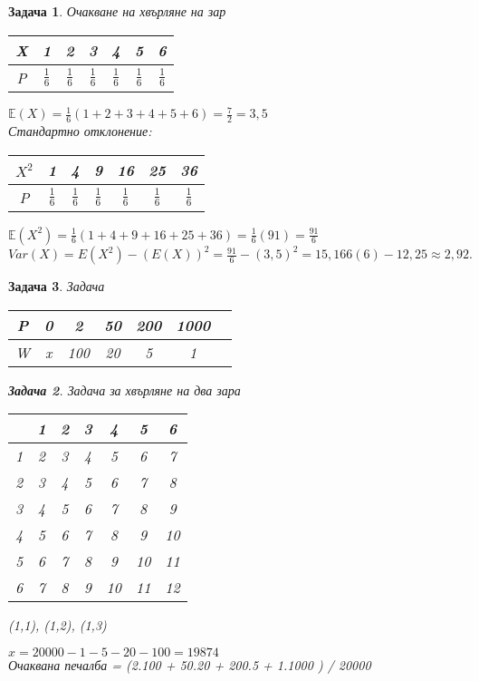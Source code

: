 \documentclass{article}
\newtheorem{problem}{Задача}
\begin{document}
		\begin{problem}
			Очакване на хвърляне на зар
			\begin{tabular}{|c|c c c c c c|} 
				\hline
				X & 1 & 2 & 3 & 4 & 5 & 6 \\ 
				\hline
				P & $\frac{1}{6}$ & $\frac{1}{6}$ & $\frac{1}{6}$ & $\frac{1}{6}$ & $\frac{1}{6}$ & $\frac{1}{6}$  \\ 
				\hline
			\end{tabular}
		\newline
		$\mathbb E(X) = \frac{1}{6}(1+2+3+4+5+6) = \frac{7}{2} = 3,5 $ \\
		Стандартно отклонение:
		\begin{tabular}{|c|c c c c c c|} 
			\hline
			$X^2$ & 1 & 4 & 9 & 16 & 25 & 36 \\ 
			\hline
			P & $\frac{1}{6}$ & $\frac{1}{6}$ & $\frac{1}{6}$ & $\frac{1}{6}$ & $\frac{1}{6}$ & $\frac{1}{6}$  \\ 
			\hline
		\end{tabular}
	\newline
		$\mathbb E(X^2) = \frac{1}{6}(1+4+9+16+25+36)  = \frac{1}{6}(91) = \frac{91}{6} $ \\
		$ Var(X) = E(X^2) - (E(X))^2 = \frac{91}{6} - (3,5)^2 = 15,166(6) - 12,25 \approx 2,92.$
	\end{problem}
	
	
	\begin{problem}
	Задача
		\begin{tabular}{|c|c c c c c c||} 
		\hline
		P&	0& 2&  50&  200&  1000&  \\
		\hline
		W&	x& 100&  20&  5&  1&  \\
		\hline
	\end{tabular}

\begin{problem}
	Задача за хвърляне на два зара
	\begin{tabular}{|c|c c c c c c|}
	  & 1 & 2 & 3 & 4 & 5 & 6 \\
		\hline
	 1  & 2 & 3 & 4 & 5 & 6 & 7 \\
	2 &	 3 & 4 & 5 & 6 & 7 & 8 \\
	3 &	4 & 5 & 6 & 7 & 8 & 9 \\
4 &		 5 & 6 & 7 & 8 & 9 & 10 \\
5 &	6 & 7 & 8 & 9 & 10 & 11 \\
6 &	7 & 8 & 9 & 10 & 11 & 12 \\

\end{tabular}
	
\end{problem}

(1,1), (1,2), (1,3)
	
	$ x = 20000- 1-5-20-100 = 19874$\\
	
	
	Очаквана печалба = (2.100 + 50.20 + 200.5 + 1.1000 ) / 20000 \\
	\end{problem}
	
\end{document}
